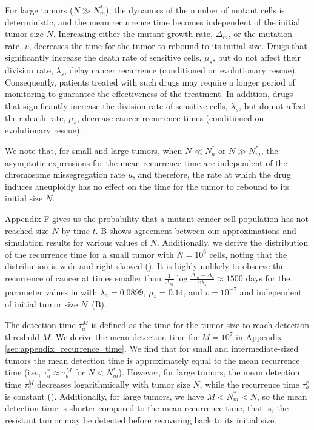 \documentclass[12pt]{extarticle}
\begin{document}
For large tumors ($N \gg N_m^*$), the dynamics of the number of mutant cells is deterministic, and the mean recurrence time becomes independent of the initial tumor size $N$.
Increasing either the mutant growth rate, $\Delta_m$, or the mutation rate, $v$, decreases the time for the tumor to rebound to its initial size.
Drugs that significantly increase the death rate of sensitive cells, $\mu_s$, but do not affect their division rate, $\lambda_s$, delay cancer recurrence (conditioned on evolutionary rescue). Consequently, patients treated with such drugs may require a longer period of monitoring to guarantee the effectiveness of the treatment.
In addition, drugs that significantly increase the division rate of sensitive cells, $\lambda_s$, but do not affect their death rate, $\mu_s$, decrease cancer recurrence times (conditioned on evolutionary rescue). %

We note that, for small and large tumors, when $N \ll N_a^*$ or $N \gg N_m^*$, the asymptotic expressions for the mean recurrence time are independent of the chromosome missegregation rate $u$, and therefore, the rate at which the drug induces aneuploidy has no effect on the time for the tumor to rebound to its initial size $N$.

Appendix F gives us the probability that a mutant cancer cell population has not reached size $N$ by time $t$. B shows agreement between our approximations and simulation results for various values of $N$. Additionally, we derive the distribution of the recurrence time for a small tumor with $N=10^6$ cells, noting that the distribution is wide and right-skewed (). It is highly unlikely to observe the recurrence of cancer at times smaller than $\frac{1}{\Delta_m}\log\frac{\Delta_m-\Delta_s}{v\lambda_s}\approx 1500$ days for the parameter values in  with $\lambda_a=0.0899$, $\mu_s=0.14$, and $v=10^{-7}$ and independent of initial tumor size $N$~(B). 

The detection time $\tau_a^{M}$ is defined as the time for the tumor size to reach detection threshold $M$. We derive the mean detection time for $M=10^7$ in Appendix \ref{sec:appendix_recurrence_time}. We find that for small and intermediate-sized tumors the mean detection time is approximately equal to the mean recurrence time (i.e., $\tau_a^r\approx\tau_a^{M}$ for $N<N_m^*$). %
However, for large tumors, the mean detection time $\tau_a^{M}$ decreases logarithmically with tumor size $N$, while the recurrence time $\tau_a^{r}$ is constant (). Additionally, for large tumors, we have $M<N_m^*<N$, so the mean detection time is shorter compared to the mean recurrence time, that is, the resistant tumor may be detected before recovering back to its initial size.
\end{document}
